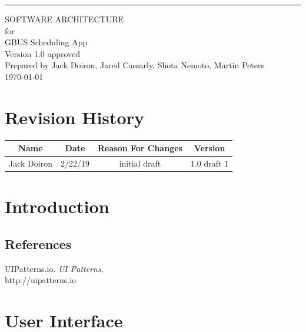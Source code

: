 \documentclass{scrreprt}
\date{}
\def\myversion{1.0 }
\begin{document}
\begin{flushright}
    \rule{16cm}{5pt}\vskip1cm
    \begin{bfseries}
        \Huge{SOFTWARE ARCHITECTURE}\\
        \vspace{1.9cm}
        for\\
        \vspace{1.9cm}
        GBUS Scheduling App\\
        \vspace{1.9cm}
        \LARGE{Version \myversion approved}\\
        \vspace{1.9cm}
        Prepared by Jack Doiron, Jared Cassarly, Shota Nemoto, Martin Peters\\
        \vspace{1.9cm}
        \today\\
    \end{bfseries}
\end{flushright}

\tableofcontents


\chapter*{Revision History}

\begin{center}
    \begin{tabular}{|c|c|c|c|}
        \hline
	    Name & Date & Reason For Changes & Version\\
        \hline
	    Jack Doiron & 2/22/19 & initial draft & 1.0 draft 1\\
        \hline
    \end{tabular}
\end{center}

\chapter{Introduction}

\section{References}
UIPatterns.io. \textit{UI Patterns},\\
http://uipatterns.io

\chapter{User Interface}
\end{document}
